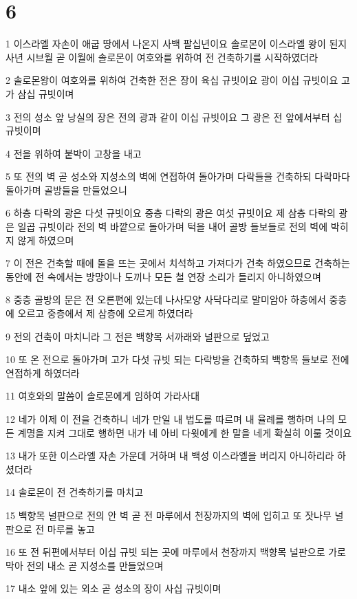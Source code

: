 \chapter{6}

\par 1 이스라엘 자손이 애굽 땅에서 나온지 사백 팔십년이요 솔로몬이 이스라엘 왕이 된지 사년 시브월 곧 이월에 솔로몬이 여호와를 위하여 전 건축하기를 시작하였더라
\par 2 솔로몬왕이 여호와를 위하여 건축한 전은 장이 육십 규빗이요 광이 이십 규빗이요 고가 삼십 규빗이며
\par 3 전의 성소 앞 낭실의 장은 전의 광과 같이 이십 규빗이요 그 광은 전 앞에서부터 십 규빗이며
\par 4 전을 위하여 붙박이 고창을 내고
\par 5 또 전의 벽 곧 성소와 지성소의 벽에 연접하여 돌아가며 다락들을 건축하되 다락마다 돌아가며 골방들을 만들었으니
\par 6 하층 다락의 광은 다섯 규빗이요 중층 다락의 광은 여섯 규빗이요 제 삼층 다락의 광은 일곱 규빗이라 전의 벽 바깥으로 돌아가며 턱을 내어 골방 들보들로 전의 벽에 박히지 않게 하였으며
\par 7 이 전은 건축할 때에 돌을 뜨는 곳에서 치석하고 가져다가 건축 하였으므로 건축하는 동안에 전 속에서는 방망이나 도끼나 모든 철 연장 소리가 들리지 아니하였으며
\par 8 중층 골방의 문은 전 오른편에 있는데 나사모양 사닥다리로 말미암아 하층에서 중층에 오르고 중층에서 제 삼층에 오르게 하였더라
\par 9 전의 건축이 마치니라 그 전은 백향목 서까래와 널판으로 덮었고
\par 10 또 온 전으로 돌아가며 고가 다섯 규빗 되는 다락방을 건축하되 백향목 들보로 전에 연접하게 하였더라
\par 11 여호와의 말씀이 솔로몬에게 임하여 가라사대
\par 12 네가 이제 이 전을 건축하니 네가 만일 내 법도를 따르며 내 율례를 행하며 나의 모든 계명을 지켜 그대로 행하면 내가 네 아비 다윗에게 한 말을 네게 확실히 이룰 것이요
\par 13 내가 또한 이스라엘 자손 가운데 거하며 내 백성 이스라엘을 버리지 아니하리라 하셨더라
\par 14 솔로몬이 전 건축하기를 마치고
\par 15 백향목 널판으로 전의 안 벽 곧 전 마루에서 천장까지의 벽에 입히고 또 잣나무 널판으로 전 마루를 놓고
\par 16 또 전 뒤편에서부터 이십 규빗 되는 곳에 마루에서 천장까지 백향목 널판으로 가로막아 전의 내소 곧 지성소를 만들었으며
\par 17 내소 앞에 있는 외소 곧 성소의 장이 사십 규빗이며
